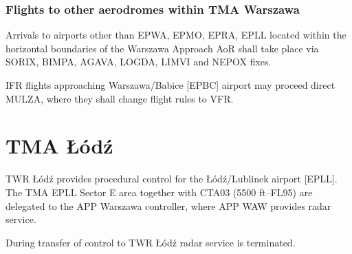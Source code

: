 \subsubsection{Flights to other aerodromes within TMA Warszawa}

Arrivals to airports other than EPWA, EPMO, EPRA, EPLL located within the horizontal boundaries of the Warszawa Approach AoR shall take place via SORIX, BIMPA, AGAVA, LOGDA, LIMVI and NEPOX fixes.

IFR flights approaching Warszawa/Babice [EPBC] airport may proceed direct MULZA, where they shall change flight rules to VFR.\@

\section{TMA Łódź}

TWR Łódź provides procedural control for the Łódź/Lublinek airport [EPLL]. The TMA EPLL Sector E area together with CTA03 (5500 ft--FL95) are delegated to the APP Warszawa controller, where APP WAW provides radar service.

\begin{table}[htbp]
	
	\caption{TMA Łódź --- entry and exit levels}
	\label{tab:acc:coordination:lodz}
\end{table}

During transfer of control to TWR Łódź radar service is terminated.


